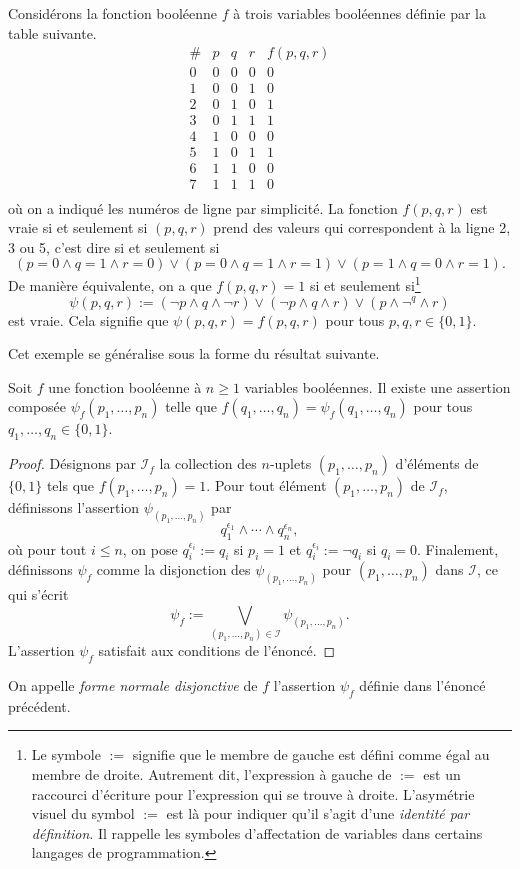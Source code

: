 \documentclass[french,course,oneside,theoremnosection]{lecture}
\begin{document}
\begin{example}
Considérons la fonction booléenne $f$ à trois variables booléennes définie par la table suivante.
\[
\begin{array}{c|ccc|c}
  \# &p & q & r & f(p, q, r) \\
  \hline
  0& 0 & 0 & 0 & 0 \\
  1& 0 & 0 & 1 & 0 \\
  2& 0 & 1 & 0 & 1 \\
  3& 0 & 1 & 1 & 1 \\
  4& 1 & 0 & 0 & 0 \\
  5& 1 & 0 & 1 & 1 \\
  6& 1 & 1 & 0 & 0 \\
  7& 1 & 1 & 1 & 0 \\
\end{array}
\] 
où on a indiqué les numéros de ligne par simplicité. La fonction $f(p,q,r)$ est vraie si et seulement si $(p,q,r)$ prend des valeurs qui correspondent à la ligne 2, 3 ou 5, c'est dire si et seulement si
\[
(p=0 \wedge q=1 \wedge r=0) \vee (p=0 \wedge q=1 \wedge r=1) \vee (p=1 \wedge q=0 \wedge r=1).
\]
De manière équivalente, on a que $f(p,q,r)=1$ si et seulement si\footnote{Le symbole $:=$ signifie que le membre de gauche est défini comme égal au membre de droite. Autrement dit, l'expression à gauche de $:=$ est un raccourci d'écriture pour l'expression qui se trouve à droite. L'asymétrie visuel du symbol $:=$ est là pour indiquer qu'il s'agit d'une \emph{identité par définition}. Il rappelle les symboles d'affectation de variables dans certains langages de programmation.}
\[\psi(p,q,r):=(\neg p \wedge q \wedge \neg r) \vee (\neg p \wedge q \wedge r) \vee (p \wedge \neg ^q \wedge r)\]
est vraie. Cela signifie que $\psi(p,q,r) = f(p, q, r)$ pour tous $p,q,r\in \{0,1\}$.
\end{example}

Cet exemple se généralise sous la forme du résultat suivante.

\begin{theorem}\label{thm:prog}
Soit $f$ une fonction booléenne à $n\geq 1$ variables booléennes. Il existe une assertion composée $\psi_f(p_1, \ldots, p_n)$ telle que $f(q_1, \ldots, q_n)=\psi_f(q_1, \ldots, q_n)$ pour tous $q_1, \ldots, q_n\in \{0,1\}$.
\end{theorem}
\begin{proof}
Désignons par $\mathcal{I}_f$ la collection des $n$-uplets $(p_1, \ldots, p_n)$ d'éléments de  $\{0,1\}$ tels que $f(p_1, \ldots, p_n)=1$. Pour tout élément $(p_1, \ldots, p_n)$ de $\mathcal{I}_f$, définissons l'assertion $\psi_{(p_1, \ldots, p_n)}$ par 
\[
q_1^{\epsilon_1} \wedge \cdots \wedge q_n^{\epsilon_n},
\]
où pour tout $i\leq n$, on pose $q_i^{\epsilon_i}:=q_i$ si $p_i=1$ et $q_i^{\epsilon_i}:=\neg q_i$ si $q_i=0$. 
Finalement, définissons $\psi_f$ comme la disjonction des $\psi_{(p_1, \ldots, p_n)}$ pour ${(p_1, \ldots, p_n)}$ dans $\mathcal{I}$, ce qui s'écrit
\[
\psi_f := \bigvee_{(p_1, \ldots, p_n) \in \mathcal{I}} \psi_{(p_1, \ldots, p_n)}.
\]
L'assertion $\psi_f$ satisfait aux conditions de l'énoncé.
\end{proof}
On appelle \emph{forme normale disjonctive} de $f$ l'assertion $\psi_f$ définie dans l'énoncé précédent. 
\end{document}
